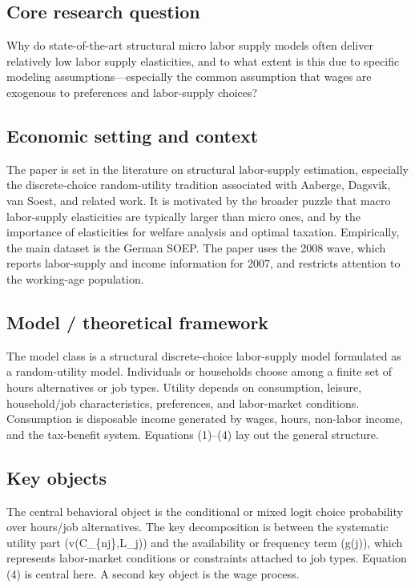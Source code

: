\documentclass[11pt,a4paper]{article}
\begin{document}
\subsection*{Core research question}
Why do state-of-the-art structural micro labor supply models often deliver relatively low labor supply elasticities, and to what extent is this due to specific modeling assumptions—especially the common assumption that wages are exogenous to preferences and labor-supply choices?

\subsection*{Economic setting and context}
The paper is set in the literature on structural labor-supply estimation, especially the discrete-choice random-utility tradition associated with Aaberge, Dagsvik, van Soest, and related work. It is motivated by the broader puzzle that macro labor-supply elasticities are typically larger than micro ones, and by the importance of elasticities for welfare analysis and optimal taxation. Empirically, the main dataset is the German SOEP. The paper uses the 2008 wave, which reports labor-supply and income information for 2007, and restricts attention to the working-age population.

\subsection*{Model / theoretical framework}
The model class is a structural discrete-choice labor-supply model formulated as a random-utility model. Individuals or households choose among a finite set of hours alternatives or job types. Utility depends on consumption, leisure, household/job characteristics, preferences, and labor-market conditions. Consumption is disposable income generated by wages, hours, non-labor income, and the tax-benefit system. Equations (1)–(4) lay out the general structure.

\subsection*{Key objects}
The central behavioral object is the conditional or mixed logit choice probability over hours/job alternatives. The key decomposition is between the systematic utility part (v(C\_\{nj\},L\_j)) and the availability or frequency term (g(j)), which represents labor-market conditions or constraints attached to job types. Equation (4) is central here. A second key object is the wage process.
\end{document}
